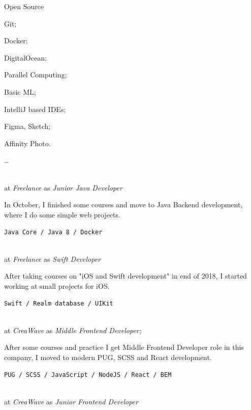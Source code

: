 \SmallSep

\begin{multicols}{3}
\begin{compactitem}[\color{Cyan}$\circ$]
    \item Open Source \heart\
    \item Git;
    \item Docker;
    \item DigitalOcean;
    \item Parallel Computing;
    \item Basic ML;
    \item IntelliJ based IDEs;
    \item Figma, Sketch;
    \item Affinity Photo.
    \item \ldots
\end{compactitem}
\end{multicols}

\Sep




 \\
at \textit{Freelance}
as \textit{Junior Java Developer}
\SmallSep

In October, I finished some courses and move to Java Backend development, where I do some simple web projects.
\SmallSep

\texttt{Java Core / Java 8 / Docker}
\SmallSep

 \\
at \textit{Freelance}
as \textit{Swift Developer}
\SmallSep

After taking courses on "iOS and Swift development" in end of 2018, I started working at small projects for iOS.
\SmallSep

\texttt{Swift / Realm database / UIKit}
\SmallSep

 \\
at \textit{CreaWave}
as \textit{Middle Frontend Developer;}
\SmallSep

After some courses and practice I get Middle Frontend Developer role in this company, I moved to modern PUG, SCSS and React development.
\SmallSep

\texttt{PUG / SCSS / JavaScript / NodeJS / React / BEM }
\SmallSep

 \\
at \textit{CreaWave}
as \textit{Junior Frontend Developer}
\SmallSep

